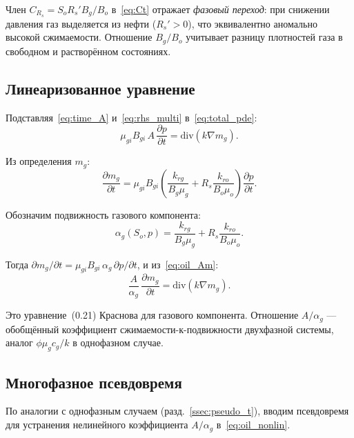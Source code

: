 ﻿\documentclass[12pt,a4paper]{article}
\begin{document}
Член $C_{R_s} = S_o R_s' B_g/B_o$ в~\eqref{eq:Ct} отражает
\emph{фазовый переход}: при снижении давления газ выделяется из
нефти ($R_s' > 0$), что эквивалентно аномально высокой сжимаемости.
Отношение $B_g/B_o$ учитывает разницу плотностей газа в свободном
и растворённом состояниях.

\subsection{Линеаризованное уравнение}\label{ssec:multi_lin}

Подставляя~\eqref{eq:time_A} и~\eqref{eq:rhs_multi}
в~\eqref{eq:total_pde}:
\begin{equation}\label{eq:oil_Am}
  \mu_{gi}B_{gi}\,A\,\frac{\partial p}{\partial t}
  = \mathrm{div}(k\nabla m_g).
\end{equation}

Из определения $m_g$:
\begin{equation}\label{eq:dmodt}
  \frac{\partial m_g}{\partial t}
  = \mu_{gi}B_{gi}\left(\frac{k_{rg}}{B_g\mu_g}
  + R_s\frac{k_{ro}}{B_o\mu_o}\right)\frac{\partial p}{\partial t}.
\end{equation}

Обозначим подвижность газового компонента:
\begin{equation}\label{eq:alpha_g}
  \alpha_g(S_o, p) = \frac{k_{rg}}{B_g\mu_g}
  + R_s\frac{k_{ro}}{B_o\mu_o}.
\end{equation}

Тогда $\partial m_g/\partial t = \mu_{gi}B_{gi}\,\alpha_g\,
\partial p/\partial t$, и из~\eqref{eq:oil_Am}:
\begin{equation}\label{eq:oil_nonlin}
  \frac{A}{\alpha_g}\,\frac{\partial m_g}{\partial t}
  = \mathrm{div}(k\nabla m_g).
\end{equation}

Это уравнение~(0.21) Краснова для газового компонента.
Отношение $A/\alpha_g$ ---
обобщённый коэффициент сжимаемости-к-подвижности двухфазной системы,
аналог $\phi\mu_g c_g/k$ в однофазном случае.

\subsection{Многофазное псевдовремя}\label{ssec:multi_pt}

По аналогии с однофазным случаем (разд.~\ref{ssec:pseudo_t}),
вводим псевдовремя для устранения нелинейного коэффициента
$A/\alpha_g$ в~\eqref{eq:oil_nonlin}.
\end{document}
